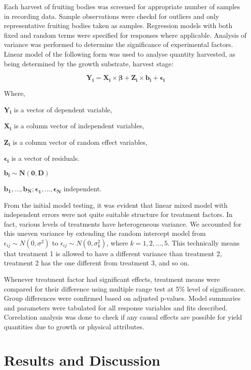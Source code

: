 \documentclass[]{article}
\begin{document}
Each harvest of fruiting bodies was screened for appropriate number of samples in recording data. Sample observations were checkd for outliers and only representative fruiting bodies taken as samples. Regression models with both fixed and random terms were specified for responses where applicable. Analysis of variance was performed to determine the significance of experimental factors. Linear model of the following form was used to analyse quantity harvested, as being determined by the growth substrate, harvest stage:

\[
\boldsymbol{Y_{i}}= \boldsymbol{X_i} \times \boldsymbol{\beta} + \boldsymbol{Z_i} \times \boldsymbol{b_i} + \boldsymbol{\epsilon_i}
\]

Where,

\(\boldsymbol{Y_{i}}\) is a vector of dependent variable,

\(\boldsymbol{X_i}\) is a column vector of independent variables,

\(\boldsymbol{Z_i}\) is a column vector of random effect variables,

\(\boldsymbol{\epsilon_i}\) is a vector of residuals.

\(\boldsymbol{b_i} \sim \boldsymbol{N(0, D)}\)

\(\boldsymbol{b_1, ..., b_N};\boldsymbol{\epsilon_1, ..., \epsilon_N}\) independent.

From the initial model testing, it was evident that linear mixed model with independent errors were not quite suitable structure for treatment factors. In fact, various levels of treatments have heterogeneous variance. We accounted for this uneven variance by extending the random intercept model from \(\epsilon_{ij} \sim N(0, \sigma^2)\) to \(\epsilon_{ij} \sim N(0, \sigma_k^2)\), where \(k = 1, 2, ..., 5\). This technically means that treatment 1 is allowed to have a different variance than treatment 2, treatment 2 has the one different from treatment 3, and so on.

Whenever treatment factor had significant effects, treatment means were compared for their difference using multiple range test at 5\% level of significance. Group differences were confirmed based on adjusted p-values. Model summaries and parameters were tabulated for all response variables and fits described. Correlation analysis was done to check if any causal effects are possible for yield quantities due to growth or physical attributes.

\hypertarget{results-and-discussion}{%
\section{Results and Discussion}\label{results-and-discussion}}
\end{document}
